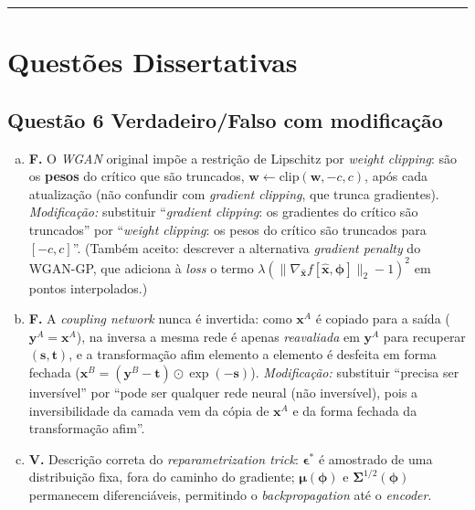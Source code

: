 \documentclass[11pt,a4paper]{article}
\begin{document}
\color{black}
\rule{\linewidth}{0.4pt}

\section*{Questões Dissertativas}

\color{blue}

\subsection*{Questão 6 \textemdash{} Verdadeiro/Falso com modificação}

\begin{enumerate}[a)]
    \item \textbf{F.} O \textit{WGAN} original impõe a restrição de Lipschitz por \textit{weight clipping}: são os \textbf{pesos} do crítico que são truncados, $\mathbf{w} \leftarrow \mathrm{clip}(\mathbf{w}, -c, c)$, após cada atualização (não confundir com \textit{gradient clipping}, que trunca gradientes). \textit{Modificação:} substituir ``\textit{gradient clipping}: os gradientes do crítico são truncados'' por ``\textit{weight clipping}: os pesos do crítico são truncados para $[-c, c]$''. (Também aceito: descrever a alternativa \textit{gradient penalty} do WGAN-GP, que adiciona à \emph{loss} o termo $\lambda(\|\nabla_{\hat{\mathbf{x}}} f[\hat{\mathbf{x}},\boldsymbol{\phi}]\|_2 - 1)^2$ em pontos interpolados.)

    \item \textbf{F.} A \textit{coupling network} nunca é invertida: como $\mathbf{x}^{A}$ é copiado para a saída ($\mathbf{y}^{A} = \mathbf{x}^{A}$), na inversa a mesma rede é apenas \emph{reavaliada} em $\mathbf{y}^{A}$ para recuperar $(\mathbf{s}, \mathbf{t})$, e a transformação afim elemento a elemento é desfeita em forma fechada ($\mathbf{x}^{B} = (\mathbf{y}^{B} - \mathbf{t})\odot\exp(-\mathbf{s})$). \textit{Modificação:} substituir ``precisa ser inversível'' por ``pode ser qualquer rede neural (não inversível), pois a inversibilidade da camada vem da cópia de $\mathbf{x}^{A}$ e da forma fechada da transformação afim''.

    \item \textbf{V.} Descrição correta do \textit{reparametrization trick}: $\boldsymbol{\epsilon}^{*}$ é amostrado de uma distribuição fixa, fora do caminho do gradiente; $\boldsymbol{\mu}(\boldsymbol{\phi})$ e $\boldsymbol{\Sigma}^{1/2}(\boldsymbol{\phi})$ permanecem diferenciáveis, permitindo o \textit{backpropagation} até o \textit{encoder}.


\end{enumerate}
\end{document}
